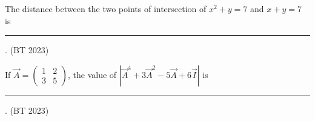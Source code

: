     \item The distance between the two points of intersection of $x^2 + y = 7$ and $x + y = 7$  is \rule{1cm}{0.01pt}.
    \hfill(BT 2023)
    \item If $\vec{A} = \begin{pmatrix} 1 & 2 \\ 3 & 5 \end{pmatrix}$, the value of $|\vec{A}^4 + 3\vec{A}^2 - 5\vec{A} + 6\vec{I}|$ is \rule{1cm}{0.01pt}.
    \hfill(BT 2023)

